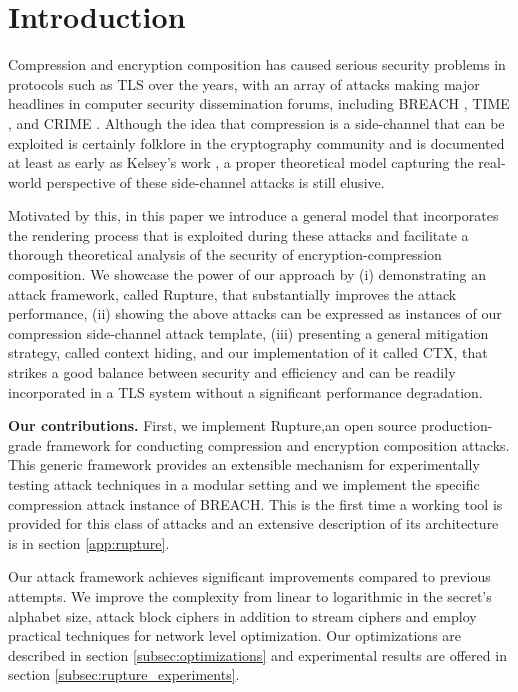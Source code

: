 \section{Introduction}\label{sec:prev}

Compression and encryption composition has caused serious security problems in
protocols such as TLS \cite{dierks2008tls} over the years, with an array of
attacks making major headlines in computer security dissemination forums,
including BREACH \cite{gluck2013breach}, TIME \cite{be2013perfect}, and CRIME
\cite{duong2012crime}. Although the idea that compression is a side-channel that
can be exploited is certainly folklore in the cryptography community and is
documented at least as early as Kelsey's work \cite{kelsey2002compression}, a
proper theoretical model capturing the real-world perspective of these
side-channel attacks is still elusive.

Motivated by this, in this paper we introduce a general model that incorporates
the rendering process that is exploited during these attacks and facilitate a
thorough theoretical analysis of the security of encryption-compression
composition. We showcase the power of our approach by (i) demonstrating an
attack framework, called Rupture, that substantially improves the attack
performance, (ii) showing the above attacks can be expressed as instances
of our compression side-channel attack template, (iii) presenting a general
mitigation strategy, called context hiding, and our implementation of it called
CTX, that strikes a good balance between security and efficiency and can be
readily incorporated in a TLS system without a significant performance
degradation.


\noindent
\textbf{Our contributions.} First, we implement Rupture,\footnotemark[1] an open
source production-grade framework for conducting compression and encryption
composition attacks. This generic framework provides an extensible mechanism for
experimentally testing attack techniques in a modular setting and we implement
the specific compression attack instance of BREACH. This is the first
time a working tool is provided for this class of attacks and an extensive
description of its architecture is in section \ref{app:rupture}.

Our attack framework achieves significant improvements compared to previous
attempts. We improve the complexity from linear to logarithmic in the secret's
alphabet size, attack block ciphers in addition to stream ciphers and employ
practical techniques for network level optimization. Our optimizations are
described in section \ref{subsec:optimizations} and experimental results are
offered in section \ref{subsec:rupture_experiments}.


